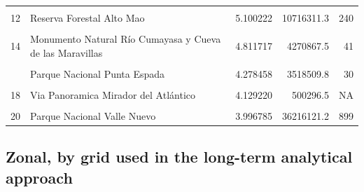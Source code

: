 \documentclass[10pt,landscape,a3paper]{article}
\begin{document}
\begin{table}[H]
\begin{tabular}[t]{llrrr}
\addlinespace
\cellcolor{lightgray}{11} & \cellcolor{lightgray}{Monumento Natural Salto El Limón} & \cellcolor{lightgray}{5.137017} & \cellcolor{lightgray}{846322.8} & \cellcolor{lightgray}{16}\\
12 & Reserva Forestal Alto Mao & 5.100222 & 10716311.3 & 240\\
\cellcolor{lightgray}{13} & \cellcolor{lightgray}{Refugio de Vida Silvestre Río Chacuey} & \cellcolor{lightgray}{5.098188} & \cellcolor{lightgray}{1976792.9} & \cellcolor{lightgray}{67}\\
14 & Monumento Natural Río Cumayasa y Cueva de las Maravillas & 4.811717 & 4270867.5 & 41\\
\cellcolor{lightgray}{15} & \cellcolor{lightgray}{Monumento Natural Cabo Samaná} & \cellcolor{lightgray}{4.624415} & \cellcolor{lightgray}{428710.5} & \cellcolor{lightgray}{8}\\
\addlinespace
16 & Parque Nacional Punta Espada & 4.278458 & 3518509.8 & 30\\
\cellcolor{lightgray}{17} & \cellcolor{lightgray}{Monumento Natural Loma Isabel de Torres} & \cellcolor{lightgray}{4.185139} & \cellcolor{lightgray}{694938.9} & \cellcolor{lightgray}{1}\\
18 & Via Panoramica Mirador del Atlántico & 4.129220 & 500296.5 & NA\\
\cellcolor{lightgray}{19} & \cellcolor{lightgray}{Parque Nacional Saltos de la Jalda} & \cellcolor{lightgray}{4.004362} & \cellcolor{lightgray}{1458936.7} & \cellcolor{lightgray}{2}\\
20 & Parque Nacional Valle Nuevo & 3.996785 & 36216121.2 & 899\\
\bottomrule
\end{tabular}
\end{table}

\hypertarget{zonal-by-grid-used-in-the-long-term-analytical-approach}{%
\subsection{Zonal, by grid used in the long-term analytical
approach}\label{zonal-by-grid-used-in-the-long-term-analytical-approach}}
\end{document}
